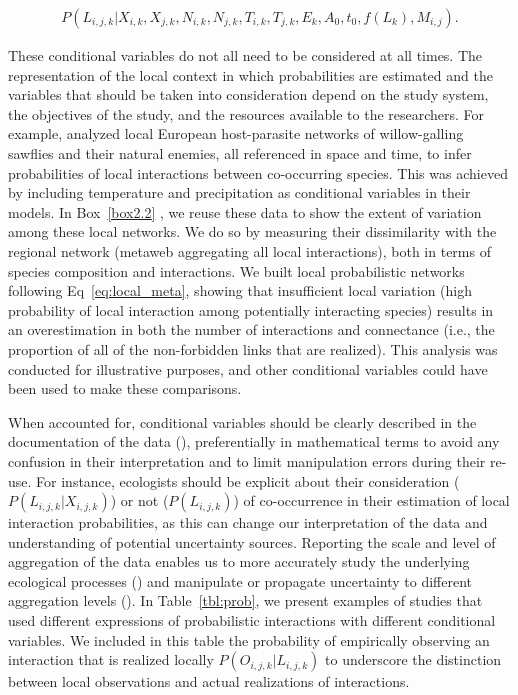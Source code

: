 \begin{eqnarray}
  \label{eq:local}
  P(L_{i, j, k} | X_{i,k}, X_{j,k}, N_{i,k}, N_{j,k}, T_{i,k}, T_{j,k},
E_k, A_0, t_0, f(L_k), M_{i, j}).
\end{eqnarray}

These conditional variables do not all need to be considered at all times. The
representation of the local context in which probabilities are estimated and the
variables that should be taken into consideration depend on the study system,
the objectives of the study, and the resources available to the researchers. For
example, \textcite{Gravel2019Bringing} analyzed local European host-parasite
networks of willow-galling sawflies and their natural enemies, all referenced in
space and time, to infer probabilities of local interactions between
co-occurring species. This was achieved by including temperature and
precipitation as conditional variables in their models. In Box~\ref{box2.2} , we
reuse these data to show the extent of variation among these local networks. We
do so by measuring their dissimilarity with the regional network (metaweb
aggregating all local interactions), both in terms of species composition and
interactions. We built local probabilistic networks following
Eq~\ref{eq:local_meta}, showing that insufficient local variation (high
probability of local interaction among potentially interacting species) results
in an overestimation in both the number of interactions and connectance (i.e.,
the proportion of all of the non-forbidden links that are realized). This
analysis was conducted for illustrative purposes, and other conditional
variables could have been used to make these comparisons.

When accounted for, conditional variables should be clearly described in the
documentation of the data (\cite{Brimacombe2023Shortcomings}), preferentially in
mathematical terms to avoid any confusion in their interpretation and to limit
manipulation errors during their re-use. For instance, ecologists should be
explicit about their consideration  ($P(L_{i, j, k} | X_{i,j,k})$) or not
($P(L_{i, j, k})$) of co-occurrence in their estimation of local interaction
probabilities, as this can change our interpretation of the data and
understanding of potential uncertainty sources. Reporting the scale and level of
aggregation of the data enables us to more accurately study the underlying
ecological processes (\cite{Clark2011Individualscale}) and manipulate or
propagate uncertainty to different aggregation levels
(\cite{Simmonds2024Recommendations}). In Table~\ref{tbl:prob}, we present examples of
studies that used different expressions of probabilistic interactions with
different conditional variables. We included in this table the probability of
empirically observing an interaction that is realized locally $P(O_{i, j, k}
\vert L_{i, j, k})$ to underscore the distinction between local observations and
actual realizations of interactions.

